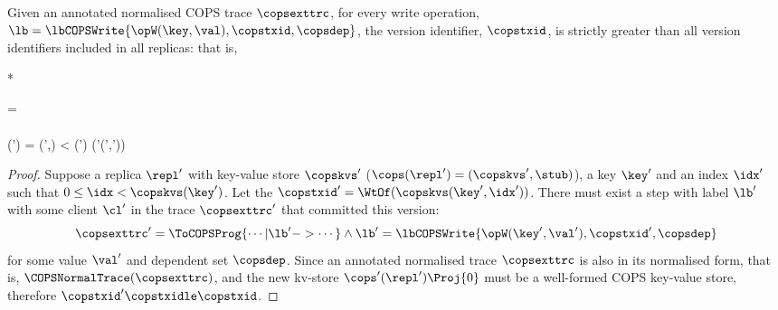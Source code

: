 
\begin{toappendix}
\label{sec:proof-append-write-op}
\begin{proposition}
\label{prop:cops-append-write}
Given an annotated normalised COPS trace \( \copsexttrc \),
for every write operation, \( \lb = \lbCOPSWrite{\opW(\key,\val), \copstxid, \copsdep } \),
the version identifier, \(\copstxid \), is strictly greater than all version identifiers included in all replicas:
that is,
\begin{Formulae}*
\begin{Formula}
\copsexttrc = 
        \\ \land 
        \\ \cops(\repl') = (\copskvs',\stub)
         \leq \idx < \copskvs(\key')
        \implies  \WtOf(\copskvs'(\key',\idx')) \copstxidle \copstxid
\end{Formula}
\end{Formulae}
\end{proposition}
\begin{proof}
Suppose a replica \( \repl' \) with key-value store \( \copskvs' \) (\( \cops(\repl') = (\copskvs',\stub)\)), a key \( \key' \)
and an index \( \idx' \) such that \( 0 \leq \idx < \copskvs(\key') \).
Let the \( \copstxid' = \WtOf(\copskvs(\key',\idx'))\).
There must exist a step with label \( \lb' \) with some client \( \cl' \)
in the trace \( \copsexttrc' \) that committed this version:
\[ 
\copsexttrc' = \ToCOPSProg{ \cdots | \lb' -> \cdots }
\land \lb' = \lbCOPSWrite{\opW(\key',\val'), \copstxid', \copsdep } 
\]
for some value \( \val ' \) and dependent set \(\copsdep \).
Since an annotated normalised trace \( \copsexttrc \) is also in its normalised form, that is, \( \COPSNormalTrace(\copsexttrc) \),
and the new kv-store \( \cops'(\repl')\Proj{0} \) must be a well-formed COPS key-value store,
therefore \( \copstxid' \copstxidle \copstxid \).
\end{proof}
\end{toappendix}
